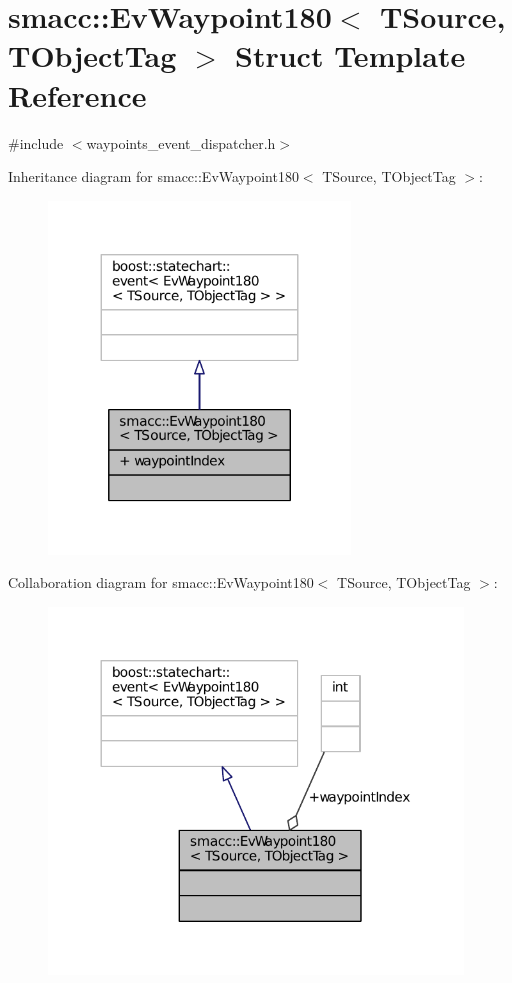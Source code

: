 \hypertarget{structsmacc_1_1EvWaypoint180}{}\section{smacc\+:\+:Ev\+Waypoint180$<$ T\+Source, T\+Object\+Tag $>$ Struct Template Reference}
\label{structsmacc_1_1EvWaypoint180}


{\ttfamily \#include $<$waypoints\+\_\+event\+\_\+dispatcher.\+h$>$}



Inheritance diagram for smacc\+:\+:Ev\+Waypoint180$<$ T\+Source, T\+Object\+Tag $>$\+:
\nopagebreak
\begin{figure}[H]
\begin{center}
\leavevmode
\includegraphics[width=227pt]{structsmacc_1_1EvWaypoint180__inherit__graph}
\end{center}
\end{figure}


Collaboration diagram for smacc\+:\+:Ev\+Waypoint180$<$ T\+Source, T\+Object\+Tag $>$\+:
\nopagebreak
\begin{figure}[H]
\begin{center}
\leavevmode
\includegraphics[width=312pt]{structsmacc_1_1EvWaypoint180__coll__graph}
\end{center}
\end{figure}
